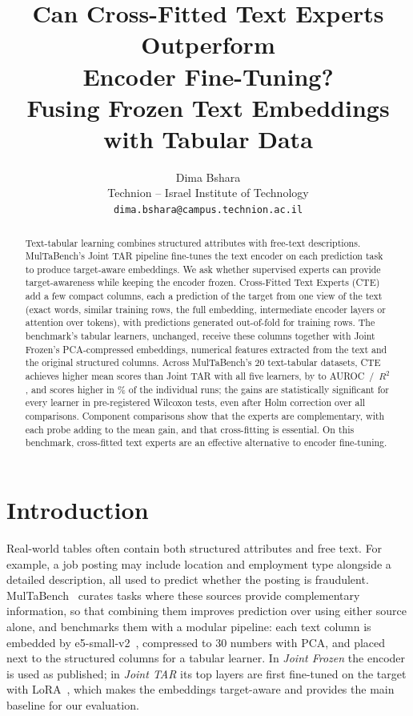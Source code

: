 \documentclass{article}
\title{Can Cross-Fitted Text Experts Outperform\\Encoder Fine-Tuning?\\Fusing Frozen Text Embeddings with Tabular Data}
\author{%
  Dima Bshara \\
  Technion -- Israel Institute of Technology \\
  \texttt{dima.bshara@campus.technion.ac.il} \\
}
\begin{document}
\maketitle

\begin{abstract}
Text-tabular learning combines structured attributes with free-text descriptions. MulTaBench's Joint TAR
pipeline fine-tunes the text encoder on each prediction task to produce target-aware embeddings. We ask
whether supervised experts can provide target-awareness while keeping the encoder frozen. Cross-Fitted
Text Experts (CTE) add a few compact columns, each a prediction of the target from one view of the text
(exact words, similar training rows, the full embedding, intermediate encoder layers or attention over
tokens), with predictions generated out-of-fold for training rows. The benchmark's tabular learners,
unchanged, receive these columns together with Joint Frozen's PCA-compressed embeddings, numerical features
extracted from the text and the original structured columns. Across MulTaBench's 20 text-tabular datasets,
CTE achieves higher mean scores than Joint TAR with all five learners, by \gainMin{} to \gainMax{}
AUROC~/~$R^2$, and scores higher in \runsWonPct\% of the \nRuns{} individual runs; the gains are statistically
significant for every learner in pre-registered Wilcoxon tests, even after Holm correction over all \nTests{}
comparisons. Component comparisons show that the experts are complementary, with each probe adding to the mean
gain, and that cross-fitting is essential. On this benchmark, cross-fitted text experts are an effective
alternative to encoder fine-tuning.
\end{abstract}

\section{Introduction}
\label{sec:intro}
Real-world tables often contain both structured attributes and free text. For example, a job posting may include
location and employment type alongside a detailed description, all used to predict whether the posting is fraudulent.
MulTaBench~\citep{arazi2026multabench} curates tasks where these sources provide complementary information, so that
combining them improves prediction over using either source alone, and benchmarks them with a modular pipeline: each text column
is embedded by e5-small-v2~\citep{wang2022e5}, compressed to 30 numbers with PCA, and placed next to the structured
columns for a tabular learner. In \emph{Joint Frozen} the encoder is used as published; in \emph{Joint TAR} its top
layers are first fine-tuned on the target with LoRA~\citep{hu2022lora}, which makes the embeddings target-aware and
provides the main baseline for our evaluation.
\end{document}
